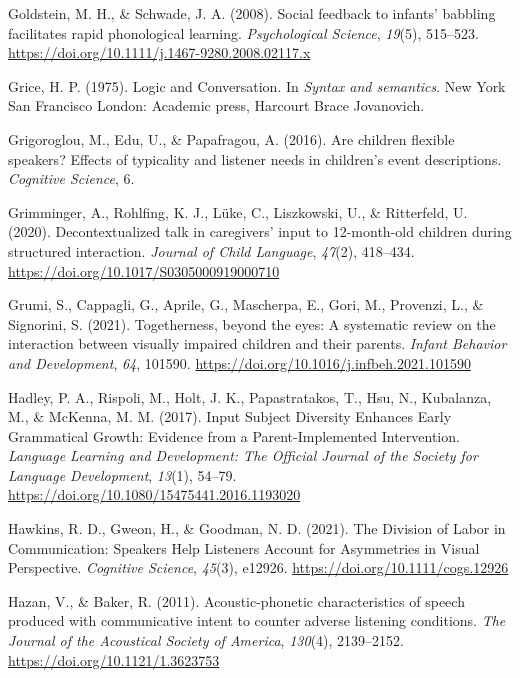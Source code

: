 \documentclass[
  man,floatsintext]{apa6}
\newlength{\cslhangindent}
\newlength{\cslentryspacingunit} %
\newenvironment{CSLReferences}[2] %
 {%
  \setlength{\parindent}{0pt}
  \ifodd #1
  \let\oldpar\par
  \def\par{\hangindent=\cslhangindent\oldpar}
  \fi
  \setlength{\parskip}{#2\cslentryspacingunit}
 }%
 {}
\begin{document}
\begin{CSLReferences}{1}{0}
\leavevmode{}%
Goldstein, M. H., \& Schwade, J. A. (2008). Social feedback to infants' babbling facilitates rapid phonological learning. \emph{Psychological Science}, \emph{19}(5), 515--523. \url{https://doi.org/10.1111/j.1467-9280.2008.02117.x}

\leavevmode{}%
Grice, H. P. (1975). {Logic and Conversation}. In \emph{{Syntax and semantics}}. New York San Francisco London: Academic press, Harcourt Brace Jovanovich.

\leavevmode{}%
Grigoroglou, M., Edu, U., \& Papafragou, A. (2016). Are children flexible speakers? {Effects} of typicality and listener needs in children's event descriptions. \emph{Cognitive Science}, 6.

\leavevmode{}%
Grimminger, A., Rohlfing, K. J., Lüke, C., Liszkowski, U., \& Ritterfeld, U. (2020). Decontextualized talk in caregivers' input to 12-month-old children during structured interaction. \emph{Journal of Child Language}, \emph{47}(2), 418--434. \url{https://doi.org/10.1017/S0305000919000710}

\leavevmode{}%
Grumi, S., Cappagli, G., Aprile, G., Mascherpa, E., Gori, M., Provenzi, L., \& Signorini, S. (2021). Togetherness, beyond the eyes: {A} systematic review on the interaction between visually impaired children and their parents. \emph{Infant Behavior and Development}, \emph{64}, 101590. \url{https://doi.org/10.1016/j.infbeh.2021.101590}

\leavevmode{}%
Hadley, P. A., Rispoli, M., Holt, J. K., Papastratakos, T., Hsu, N., Kubalanza, M., \& McKenna, M. M. (2017). Input {Subject Diversity Enhances Early Grammatical Growth}: {Evidence} from a {Parent-Implemented Intervention}. \emph{Language Learning and Development: The Official Journal of the Society for Language Development}, \emph{13}(1), 54--79. \url{https://doi.org/10.1080/15475441.2016.1193020}

\leavevmode{}%
Hawkins, R. D., Gweon, H., \& Goodman, N. D. (2021). The {Division} of {Labor} in {Communication}: {Speakers Help Listeners Account} for {Asymmetries} in {Visual Perspective}. \emph{Cognitive Science}, \emph{45}(3), e12926. \url{https://doi.org/10.1111/cogs.12926}

\leavevmode{}%
Hazan, V., \& Baker, R. (2011). Acoustic-phonetic characteristics of speech produced with communicative intent to counter adverse listening conditions. \emph{The Journal of the Acoustical Society of America}, \emph{130}(4), 2139--2152. \url{https://doi.org/10.1121/1.3623753}


\end{CSLReferences}
\end{document}
